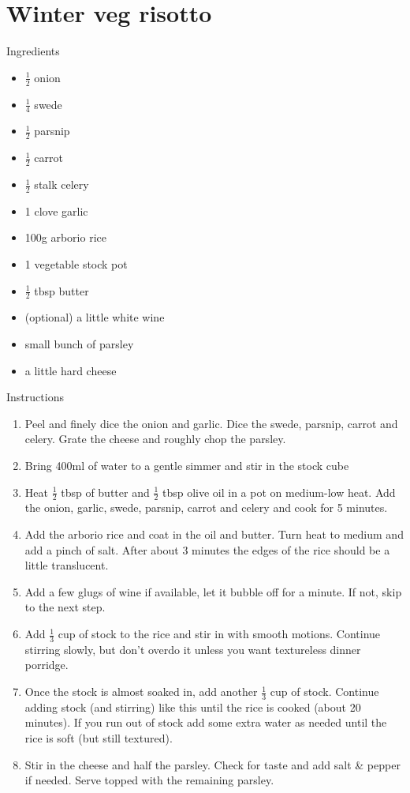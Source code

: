 \documentclass[../dinner.tex]{subfiles}
\begin{document}
	\pagestyle{fancy}
	\fancyhf{}
	\newpage
	\section{Winter veg risotto}
	\lhead{}
	{\Large Ingredients}
	\begin{multicols}{2}
		\begin{itemize}
			\item \(\frac{1}{2}\) onion
			\item \(\frac{1}{4}\) swede
			\item \(\frac{1}{2}\) parsnip
			\item \(\frac{1}{2}\) carrot
			\item \(\frac{1}{2}\) stalk celery
			\item 1 clove garlic
		\end{itemize}
		\columnbreak
		\begin{itemize}
			\item 100g arborio rice
			\item 1 vegetable stock pot
			\item \(\frac{1}{2}\) tbsp butter
			\item (optional) a little white wine
			\item small bunch of parsley
			\item a little hard cheese
		\end{itemize}
	\end{multicols}

	{\Large Instructions}
	\begin{enumerate}
		\item Peel and finely dice the onion and garlic. Dice the swede, parsnip, carrot and celery. Grate the cheese and roughly chop the parsley.
		\item Bring 400ml of water to a gentle simmer and stir in the stock cube
		\item Heat \(\frac{1}{2}\) tbsp of butter and \(\frac{1}{2}\) tbsp olive oil in a pot on medium-low heat. Add the onion, garlic, swede, parsnip, carrot and celery and cook for 5 minutes.
		\item Add the arborio rice and coat in the oil and butter. Turn heat to medium and add a pinch of salt. After about 3 minutes the edges of the rice should be a little translucent.
		\item Add a few glugs of wine if available, let it bubble off for a minute. If not, skip to the next step.
		\item Add \(\frac{1}{3}\) cup of stock to the rice and stir in with smooth motions. Continue stirring slowly, but don't overdo it unless you want textureless dinner porridge.
		\item Once the stock is almost soaked in, add another \(\frac{1}{3}\) cup of stock. Continue adding stock (and stirring) like this until the rice is cooked (about 20 minutes). If you run out of stock add some extra water as needed until the rice is soft (but still textured).
		\item Stir in the cheese and half the parsley. Check for taste and add salt \& pepper if needed. Serve topped with the remaining parsley.
	\end{enumerate}
\end{document}

